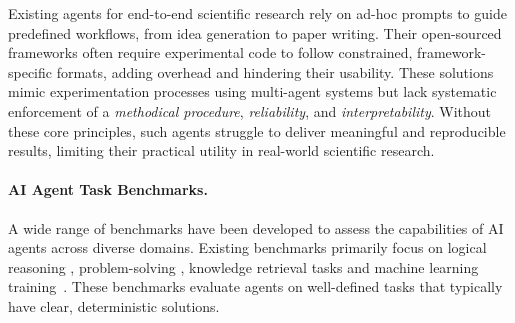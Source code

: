 Existing agents for end-to-end scientific research \cite{schmidgall2025agent, lu2024ai, dolphin, SciAgents} rely on ad-hoc prompts to guide predefined workflows, from idea generation to paper writing.
Their open-sourced frameworks often require experimental code to follow constrained, framework-specific formats, adding overhead and hindering their usability.
These solutions mimic experimentation processes using multi-agent systems but lack systematic enforcement of a \textit{methodical procedure}, \textit{reliability}, and \textit{interpretability}.
Without these core principles, such agents struggle to deliver meaningful and reproducible results, limiting their practical utility in real-world scientific research.






\paragraph{AI Agent Task Benchmarks.}

A wide range of benchmarks have been developed to assess the capabilities of AI agents across diverse domains. Existing benchmarks primarily focus on logical reasoning \cite{GSM8K, mmlu, reasoning-bench}, problem-solving \cite{math-bench, math-bench2, problem-solve1, problem-solve2, science-tutor1}, knowledge retrieval tasks \cite{retrival-bench1} and machine learning training~\cite{huang2310mlagentbench, automl1, automl2}. These benchmarks evaluate agents on well-defined tasks that typically have clear, deterministic solutions.


